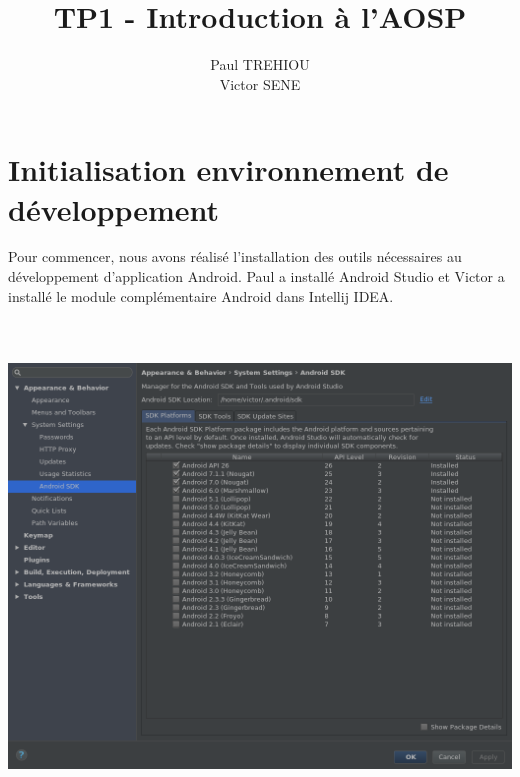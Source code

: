 \documentclass{ipfwpaper}
\author{Paul TREHIOU \formatemail{paul.trahiou@utbm.fr} \\ Victor SENE \formatemail{victor.sene@utbm.fr}}
\title{TP1 - Introduction à l'AOSP}  %
\begin{document}
\maketitle  %
\newpage


		\listoffigures
		\listoftables
\tableofcontents %
\newpage
\section{Initialisation environnement de développement}
Pour commencer, nous avons réalisé l'installation des outils nécessaires au développement d'application Android. Paul a installé Android Studio et Victor a installé le module complémentaire Android dans Intellij IDEA.

\begin{center}
\includegraphics[height=13cm]{img/screenshot_sdk.png}
\end{center}
\end{document}
